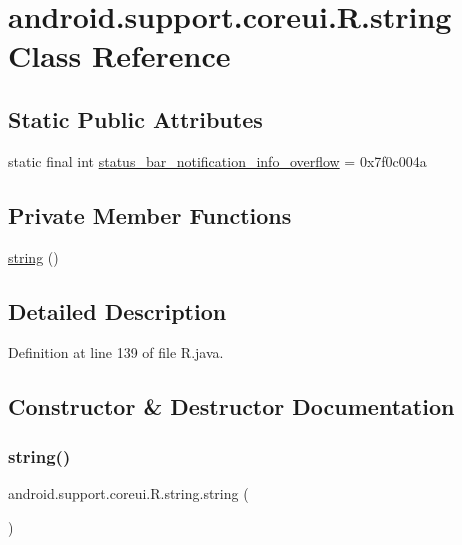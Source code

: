 \hypertarget{classandroid_1_1support_1_1coreui_1_1_r_1_1string}{}\section{android.\+support.\+coreui.\+R.\+string Class Reference}
\label{classandroid_1_1support_1_1coreui_1_1_r_1_1string}
\subsection*{Static Public Attributes}
\begin{DoxyCompactItemize}
\item 
static final int \mbox{\hyperlink{classandroid_1_1support_1_1coreui_1_1_r_1_1string_adcf4ea883d32357717589d816f0e05ce}{status\+\_\+bar\+\_\+notification\+\_\+info\+\_\+overflow}} = 0x7f0c004a
\end{DoxyCompactItemize}
\subsection*{Private Member Functions}
\begin{DoxyCompactItemize}
\item 
\mbox{\hyperlink{classandroid_1_1support_1_1coreui_1_1_r_1_1string_a9286c38aa0d71f26125c120351fb989d}{string}} ()
\end{DoxyCompactItemize}


\subsection{Detailed Description}


Definition at line 139 of file R.\+java.



\subsection{Constructor \& Destructor Documentation}
\mbox{\label{classandroid_1_1support_1_1coreui_1_1_r_1_1string_a9286c38aa0d71f26125c120351fb989d}} 
\subsubsection{\texorpdfstring{string()}{string()}}
{\footnotesize\ttfamily android.\+support.\+coreui.\+R.\+string.\+string (\begin{DoxyParamCaption}{ }\end{DoxyParamCaption})\hspace{0.3cm}{\ttfamily [private]}}



